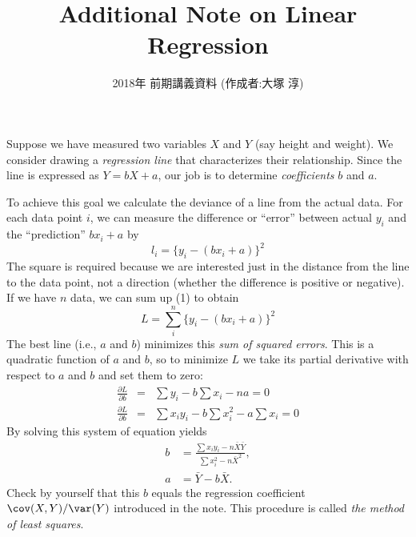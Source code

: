 \documentclass[11pt]{article}
\date{2018年 前期講義資料 (作成者:大塚 淳)}
\title{Additional Note on Linear Regression}
\begin{document}
\maketitle
Suppose we have measured two variables $X$ and $Y$ (say height and weight). 
We consider drawing a \emph{regression line} that characterizes their relationship.
Since the line is expressed as $Y = b X + a$, our job is to determine \emph{coefficients} $b$ and $a$. 

To achieve this goal we calculate the deviance of a line from the actual data. 
For each data point $i$, we can measure the difference or ``error'' between actual $y_i$ and the ``prediction'' $bx_i + a$ by
\begin{equation}
l_i = \{ y_i - (bx_i + a) \}^2 
\end{equation}
The square is required because we are interested just in the distance from the line to the data point, not a direction (whether the difference is positive or negative). 
If we have $n$ data, we can sum up (1) to obtain
\begin{equation}
L = \sum^n_i \{ y_i - (bx_i + a) \}^2 
\end{equation}
The best line (i.e., $a$ and $b$) minimizes this \emph{sum of squared errors}.
This is a quadratic function of $a$ and $b$, so to minimize $L$ we take its partial derivative with respect to $a$ and $b$ and set them to zero:
\begin{eqnarray}
\frac{\partial L}{\partial b}  &=& \sum y_i - b\sum x_i - na = 0 \nonumber \\
\frac{\partial L}{\partial b}  &=& \sum x_i y_i - b\sum x_i^2 - a \sum x_i = 0 \nonumber
\end{eqnarray}
By solving this system of equation yields
\begin{eqnarray}
 b &= \frac{\sum x_i y_i - n \bar{X} \bar{Y}}{\sum x_i^2 - n \bar{X}^2}, \nonumber \\
 a &= \bar{Y} - b \bar{X}. \nonumber
\end{eqnarray}
Check by yourself that this $b$ equals the regression coefficient $\cov(X,Y) / \var(Y)$ introduced in the note. 
This procedure is called \emph{the method of least squares}.
\end{document}

